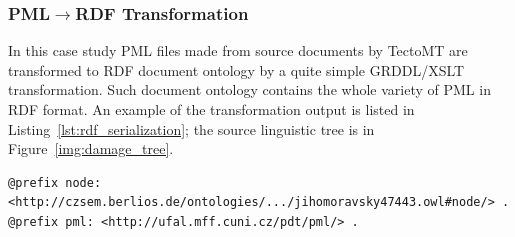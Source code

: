 \subsubsection{PML$\rightarrow$RDF Transformation} \label{sec:pml_to_rdf}

In this case study PML files made from source documents by TectoMT are transformed to RDF document ontology by a quite simple GRDDL/XSLT transformation. Such document ontology contains the whole variety of PML in RDF format. An example of the transformation output is listed in Listing~\ref{lst:rdf_serialization}; the source linguistic tree is in Figure~\ref{img:damage_tree}.



\begin{listing}[ht]
\begin{verbatim}
@prefix node: <http://czsem.berlios.de/ontologies/.../jihomoravsky47443.owl#node/> .
@prefix pml: <http://ufal.mff.cuni.cz/pdt/pml/> .


\end{verbatim}
\end{listing}
